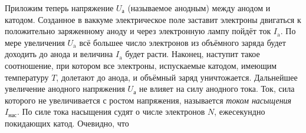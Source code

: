 \documentclass[a4paper,10pt]{book}
\begin{document}
\begin{figure}[h]
	\caption{}
	\label{pic44}
\end{figure}
Приложим теперь напряжение $U_\text{а}$ (называемое анодным) между анодом и катодом. Созданное в ваккуме электрическое поле заставит электроны двигаться к положительно заряженному аноду и через электронную лампу пойдёт ток $I_\text{a}$. По мере увеличения $U_\text{a}$ всё большее число электронов из объёмного заряда будет доходить до анода и величина $I_\text{a}$ будет расти. Наконец, наступит такое соотношение, при котором все электроны, испускаемые катодом, имеющим температуру $T$, долетают до анода, и объёмный заряд уничтожается. Дальнейшее увеличение анодного напряжения $U_\text{а}$ не влияет на силу анодного тока. Ток, сила которого не увеличивается с ростом напряжения, называется \emph{током насыщения} $I_\text{нас}$. По силе тока насыщения судят о числе электронов $N$, ежесекундно покидающих катод. Очевидно, что
\end{document}
